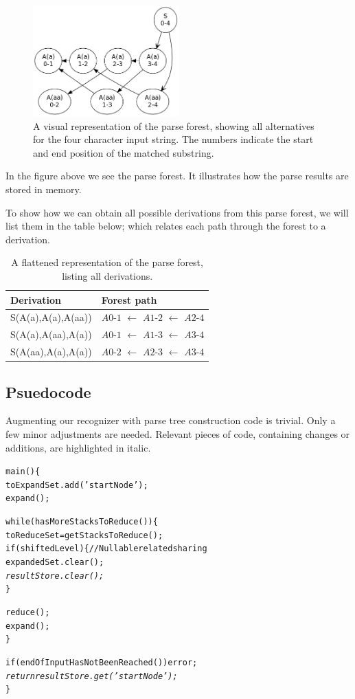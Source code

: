 \documentclass[a4paper,10pt]{article}
\begin{document}
\begin{figure}[H]
\centering
\includegraphics[width=0.5\textwidth]{a_aa-forest.png}
\caption{A visual representation of the parse forest, showing all alternatives for the four character input string. The numbers indicate the start and end position of the matched substring.}
\end{figure}

In the figure above we see the parse forest. It illustrates how the parse results are stored in memory.

To show how we can obtain all possible derivations from this parse forest, we will list them in the table below; which relates each path through the forest to a derivation.

\begin{table}[H]
\centering
\begin{tabular}{ p{15em} p{15em} }
Derivation & Forest path\\
\hline
S(A(a),A(a),A(aa)) & $A0$-$1$ $\leftarrow$ $A1$-$2$ $\leftarrow$ $A2$-$4$\\
S(A(a),A(aa),A(a)) & $A0$-$1$ $\leftarrow$ $A1$-$3$ $\leftarrow$ $A3$-$4$\\
S(A(aa),A(a),A(a)) & $A0$-$2$ $\leftarrow$ $A2$-$3$ $\leftarrow$ $A3$-$4$
\end{tabular}
\caption{A flattened representation of the parse forest, listing all derivations.}
\end{table}

\subsection{Psuedocode}

Augmenting our recognizer with parse tree construction code is trivial. Only a few minor adjustments are needed. Relevant pieces of code, containing changes or additions, are highlighted in italic.

\pagebreak
{\small
\begin{alltt}
main()\{
  toExpandSet.add('startNode');
  expand();
  
  while(hasMoreStacksToReduce())\{
    toReduceSet = getStacksToReduce();
    if(shiftedLevel)\{ // Nullable related sharing
      expandedSet.clear();\textit{
      resultStore.clear();}
    \}
    
    reduce();
    expand();
  \}
  
  if(endOfInputHasNotBeenReached()) error;
  \textit{
  return resultStore.get('startNode');}
\}
\end{alltt}
}
\end{document}
